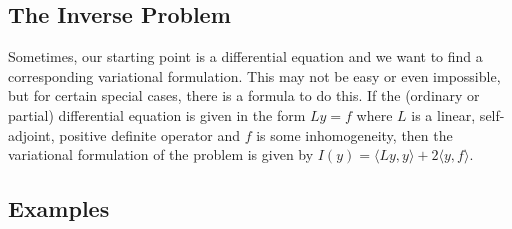 



\subsection{The Inverse Problem}
Sometimes, our starting point is a differential equation and we want to find a corresponding variational formulation. This may not be easy or even impossible, but for certain special cases, there is a formula to do this. If the (ordinary or partial) differential equation is given in the form $L y = f$ where $L$ is a linear, self-adjoint, positive definite operator and $f$ is some inhomogeneity, then the variational formulation of the problem is given by $I(y) = \langle L y, y \rangle + 2 \langle y, f \rangle $.


\subsection{Examples}






